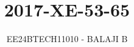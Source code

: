 \documentclass[journal]{IEEEtran}
\begin{document}

\vspace{3cm}

\title{2017-XE-53-65}
\author{EE24BTECH11010 - BALAJI B}
{\let\newpage\relax\maketitle}

\renewcommand{\thefigure}{\theenumi}
\renewcommand{\thetable}{\theenumi}
\setlength{\intextsep}{10pt} %


\renewcommand{\thetable}{\theenumi}
\end{document}
